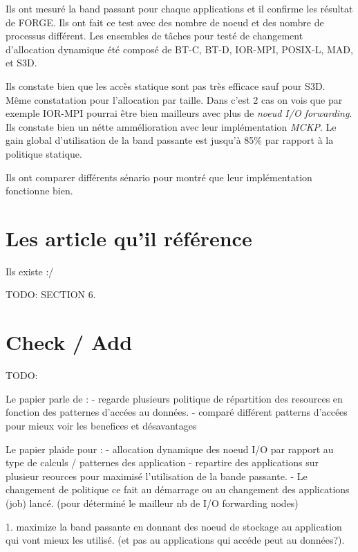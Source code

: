 \documentclass[10pt, a4paper]{article}
\begin{document}
Ils ont mesuré la band passant pour chaque applications et il confirme les résultat de FORGE. Ils ont fait ce test avec des nombre de noeud et des nombre de processus différent.
Les ensembles de tâches pour testé de changement d'allocation dynamique été composé de BT-C, BT-D, IOR-MPI, POSIX-L, MAD, et S3D.

Ils constate bien que les accès statique sont pas très efficace sauf pour S3D. Même constatation pour l'allocation par taille. Dans c'est 2 cas on vois que par exemple IOR-MPI pourrai être bien mailleurs avec plus de \emph{noeud I/O forwarding}. Ils constate bien un nétte ammélioration avec leur implémentation \emph{MCKP}. Le gain global d'utilisation de la band passante est jusqu'à 85\% par rapport à la politique statique.

Ils ont comparer différents sénario pour montré que leur implémentation fonctionne bien.

\section{Les article qu'il référence}

Ils existe :/

TODO: SECTION 6.

\section{Check / Add}

TODO:

Le papier parle de :
- regarde plusieurs politique de répartition des resources en fonction des patternes d'accées au données.
- comparé différent patterns d'accées pour mieux voir les benefices et désavantages

Le papier plaide pour :
- allocation dynamique des noeud I/O par rapport au type de calculs / patternes des application
- repartire des applications sur plusieur reources pour maximisé l'utilisation de la bande passante.
- Le changement de politique ce fait au démarrage ou au changement des applications (job) lancé. (pour déterminé le mailleur nb de I/O forwarding nodes)

1. maximize la band passante en donnant des noeud de stockage au application qui vont mieux les utilisé. (et pas au applications qui accéde peut au données?).


\nocite{*}
\end{document}
